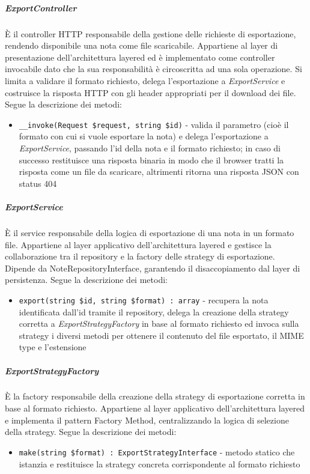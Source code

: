 \documentclass[a4paper,10pt]{article}
\begin{document}
\subparagraph{ExportController} È il controller HTTP responsabile della gestione delle richieste di esportazione, rendendo disponibile una nota come file scaricabile. Appartiene al layer di presentazione dell'architettura layered ed è implementato come controller invocabile dato che la sua responsabilità è circoscritta ad una sola operazione. Si limita a validare il formato richiesto, delega l'esportazione a \textit{ExportService} e costruisce la risposta HTTP con gli header appropriati per il download dei file. Segue la descrizione dei metodi:
\begin{itemize}
    \item \texttt{\_\_invoke(Request \$request, string \$id)} - valida il parametro (cioè il formato con cui si vuole esportare la nota) e delega l'esportazione a \textit{ExportService}, passando l'id della nota e il formato richiesto; in caso di successo restituisce una risposta binaria in modo che il browser tratti la risposta come un file da scaricare, altrimenti ritorna una risposta JSON con status 404
\end{itemize}
\subparagraph{ExportService} È il service responsabile della logica di esportazione di una nota in un formato file. Appartiene al layer applicativo dell'architettura layered e gestisce la collaborazione tra il repository e la factory delle strategy di esportazione. Dipende da NoteRepositoryInterface, garantendo il disaccopiamento dal layer di persistenza. Segue la descrizione dei metodi:
\begin{itemize}
    \item \texttt{export(string \$id, string \$format) : array} - recupera la nota identificata dall'id tramite il repository, delega la creazione della strategy corretta a \textit{ExportStrategyFactory} in base al formato richiesto ed invoca sulla strategy i diversi metodi per ottenere il contenuto del file esportato, il MIME type e l'estensione
\end{itemize}
\subparagraph{ExportStrategyFactory} È la factory responsabile della creazione della strategy di esportazione corretta in base al formato richiesto. Appartiene al layer applicativo dell'architettura layered e implementa il pattern Factory Method, centralizzando la logica di selezione della strategy. Segue la descrizione dei metodi:
\begin{itemize}
    \item \texttt{make(string \$format) : ExportStrategyInterface} - metodo statico che istanzia e restituisce la strategy concreta corrispondente al formato richiesto
\end{itemize}
\end{document}
